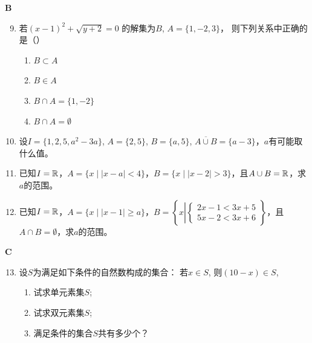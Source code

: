 \begin{center}
\bfseries B
\end{center}

\begin{enumerate}\setcounter{enumi}{8}
    \item 若$(x-1)^2+\sqrt{y+2}=0$
    的解集为$B$, $A=\{1,-2,3\}$，    则下列关系中正确的是（\qquad ）
\begin{multicols}{4}
   \begin{enumerate}[(1)]
    \item $B\subset A$
    \item $B\in A$
    \item $B\cap A=\{1,-2\}$
    \item $B\cap A=\emptyset$
   \end{enumerate} 
\end{multicols}

\item 设$I=\{1,2,5,a^2-3a\}$, $A=\{2,5\}$, $B=\{a,5\}$, $\overline{A\cup B}=\{a-3\}$，$a$有可能取什么值。

\item 已知$I=\mathbb{R}$，$A=\{x\mid |x-a|<4\}$，$B=\{x\mid |x-2|>3\}$，且$A\cup B=\mathbb{R}$，求$a$的范围。
\item 已知$I=\mathbb{R}$，$A=\{x\mid |x-1|\ge a\}$，$B=\left\{x\left|\begin{cases}
    2x-1<3x+5\\ 5x-2<3x+6
\end{cases}\right.\right\}$，且$A\cap B=\emptyset$，求$a$的范围。

\end{enumerate}


\begin{center}
    \bfseries C
\end{center}

\begin{enumerate}\setcounter{enumi}{12}
    \item 设$S$为满足如下条件的自然数构成的集合：
    若$x\in S$, 则$(10-x)\in S$,
\begin{enumerate}[(1)]
\item 试求单元素集$S$;
\item 试求双元素集$S$;
\item 满足条件的集合$S$共有多少个？
\end{enumerate}

\end{enumerate}


